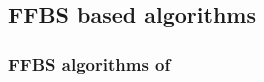 \documentclass[nolayout]{article}
\theoremstyle{plain}
\theoremstyle{definition}
\newcommand{\1}{\mathbbm{1}}
\def\eqsp{\,}
\begin{document}


\subsection{FFBS based algorithms}%
\subsubsection{FFBS algorithms of \cite{sarkka:bunch:godsill:2012,lindsten:bunch:godsill:schon:2013,lindsten:bunch:sarkka:schon:godsill:2015}}
%
%
\end{document}
